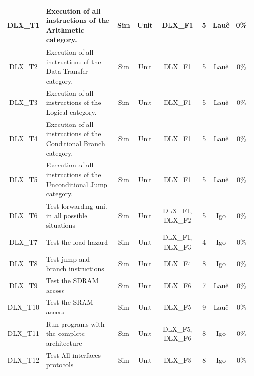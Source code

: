 \documentclass{article}
\begin{document}
\begin{landscape}
\begin{center}
\begin{longtable}[pos]{| c | m{5cm} | c | c | c | c | c | c |}
        \hline
        \endlastfoot
      	DLX\_T1      & Execution of all instructions of the Arithmetic category.  &	Sim & Unit & DLX\_F1 & 5 & Lauê & 0\% \\ \hline   	
      	DLX\_T2      & Execution of all instructions of the Data Transfer category.  &	Sim & Unit & DLX\_F1 & 5 & Lauê & 0\% \\ \hline   	
      	DLX\_T3      & Execution of all instructions of the Logical category.   &	Sim & Unit & DLX\_F1 & 5 & Lauê & 0\% \\ \hline   
      	DLX\_T4      & Execution of all instructions of the Conditional Branch category.   &	Sim & Unit & DLX\_F1 & 5 & Lauê & 0\% \\ \hline   
      	DLX\_T5      & Execution of all instructions of the Unconditional Jump category.  &	Sim & Unit & DLX\_F1 & 5 & Lauê & 0\% \\ \hline    
		DLX\_T6      & Test forwarding unit in all possible situations  &	Sim & Unit & DLX\_F1, DLX\_F2 & 5 & Igo & 0\% \\ \hline   
		DLX\_T7      & Test the load hazard  &	Sim & Unit & DLX\_F1, DLX\_F3 & 4 & Igo & 0\% \\ \hline   
		DLX\_T8      & Test jump and branch instructions  &	Sim & Unit & DLX\_F4 & 8 & Igo & 0\% \\ \hline        
		DLX\_T9      & Test the SDRAM access  &	Sim & Unit & DLX\_F6 & 7 & Lauê & 0\% \\ \hline        
		DLX\_T10      & Test the SRAM access  &	Sim & Unit & DLX\_F5 & 9 & Lauê & 0\% \\ \hline        
		DLX\_T11      & Run programs with the complete architecture  &	Sim & Unit & DLX\_F5, DLX\_F6 & 8 & Igo & 0\% \\ \hline        
		DLX\_T12      & Test All interfaces protocols  &	Sim & Unit & DLX\_F8 & 8 & Igo & 0\% \\ \hline        

      \end{longtable}
    \end{center}		
  \end{landscape}
  
  \newpage
\end{document}
